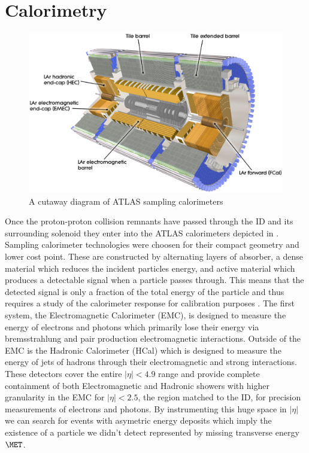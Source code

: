 \section{Calorimetry} \label{sec:atlas:calorimetry}

\begin{figure}[!htbp]
  \begin{center}
    \includegraphics[width=0.8\linewidth]{figures/atlas/calorimeter_cutaway}
    \caption{ \cite{PERF-2007-01} A cutaway diagram of ATLAS sampling calorimeters}
    \label{fig:calorimeter_cutaway}
  \end{center}
\end{figure}

Once the proton-proton collision remnants have passed through the ID and its
surrounding solenoid they enter into the ATLAS calorimeters depicted in
.  Sampling calorimeter technologies were choosen
for their compact geometry and lower cost point.  These are constructed by
alternating layers of absorber, a dense material which reduces the incident
particles energy, and active material which produces a detectable signal when a
particle passes through.  This means that the detected signal is only a fraction
of the total energy of the particle and thus requires a study of the calorimeter
response for calibration purposes \cite{Fabjan:692252}. The first system, the
Electromagnetic Calorimeter (EMC), is designed to measure the energy of
electrons and photons which primarily lose their energy via bremsstrahlung and
pair production electromagnetic interactions.  Outside of the EMC is the
Hadronic Calorimeter (HCal) which is designed to measure the energy of jets of
hadrons through their electromagnetic and strong interactions. These detectors
cover the entire $|\eta| < 4.9$ range and provide complete containment of both
Electromagnetic and Hadronic showers with higher granularity in the EMC for
$|\eta| < 2.5$, the region matched to the ID, for precision measurements of
electrons and photons.  By instrumenting this huge space in $|\eta|$ we can
search for events with asymetric energy deposits which imply the existence of a
particle we didn't detect represented by missing transverse energy $\MET$.

